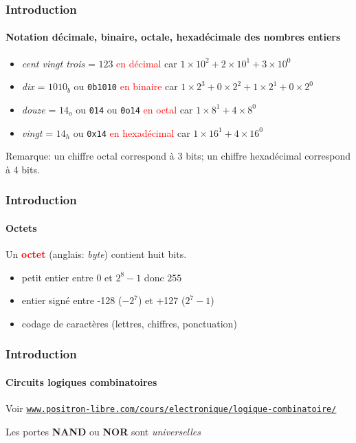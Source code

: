 \documentclass[xcolor=svgnames,final,smaller,a4]{beamer}
\begin{document}
\begin{frame}
  \frametitle{Introduction}
  \framesubtitle{Notation décimale, binaire,  octale, hexadécimale des nombres entiers}


  \begin{itemize}
    \item
    \textit
   {cent vingt trois} = $123$ \textcolor{red}{en décimal}
  car $1 \times 10^2 + 2 \times 10^1 + 3 \times 10^0$

  \item
  \textit{dix} = $1010_b$ ou \texttt{0b1010}
  \textcolor{red}{en binaire}
  car $1  \times 2^3 + 0 \times 2^2 + 1 \times 2^1 + 0 \times 2^0$

  \item
  \textit{douze} = $14_o$ ou \texttt{014} ou \texttt{0o14}
  \textcolor{red}{en octal}
  car $1  \times 8^1 + 4 \times 8^0$

  \item \textit{vingt} =  $14_h$ ou \texttt{0x14}
  \textcolor{red}{en hexadécimal}
  car $1  \times 16^1 + 4 \times 16^0$
 
  \end{itemize}
  
  \vspace{1cm}
  Remarque: un chiffre octal correspond à 3 bits; un chiffre hexadécimal correspond à 4 bits.
\end{frame}
\begin{frame}
  \frametitle{Introduction}
  \framesubtitle{Octets}

Un  \textcolor{red}{\textbf{octet}} (anglais: \textit{byte}) contient huit bits.

\begin{itemize}
\item petit entier entre $0$ et $2^8-1$ donc $255$

\item entier signé entre -128 ($-2^7$) et +127 ($2^7-1$)

\item codage de caractères (lettres, chiffres, ponctuation)

\end{itemize}
\end{frame}



\begin{frame}
  \frametitle{Introduction}
  \framesubtitle{Circuits logiques combinatoires}

Voir \href{https://www.positron-libre.com/cours/electronique/logique-combinatoire/}{\texttt{www.positron-libre.com/cours/electronique/logique-combinatoire/}}

\vspace{5cm}

Les portes \textbf{NAND} ou \textbf{NOR} sont \textit{universelles}

\end{frame}
\end{document}

